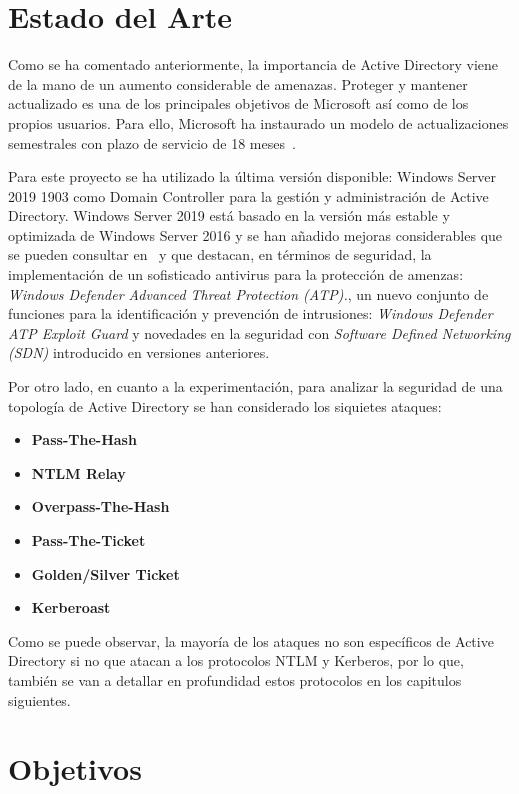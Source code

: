 \section{Estado del Arte}

Como se ha comentado anteriormente, la importancia de Active Directory viene de la mano de  un aumento considerable de amenazas. Proteger y mantener actualizado es una de los principales objetivos de Microsoft así como de los propios usuarios. Para ello, Microsoft ha instaurado un modelo de actualizaciones semestrales con plazo de servicio de 18 meses~\cite{Capitulo1:Update}.

Para este proyecto se ha utilizado la última versión disponible: Windows Server 2019 1903 como Domain Controller para la gestión y administración de Active Directory. Windows Server 2019 está basado en la versión más estable y optimizada de Windows Server 2016 y se han añadido mejoras considerables que se pueden consultar en~\cite{Capitulo1:WindowsServer2019} y que destacan, en  términos de seguridad, la implementación de un sofisticado antivirus para la protección de amenzas: {\it Windows Defender Advanced Threat Protection (ATP).}, un nuevo conjunto de funciones para la identificación y prevención de intrusiones: {\it Windows Defender ATP Exploit Guard} y novedades en la seguridad con {\it Software Defined Networking (SDN)} introducido en versiones anteriores. 

Por otro lado, en cuanto a la experimentación, para analizar la seguridad de una topología de Active Directory se han considerado los siquietes ataques:

\begin{itemize}
\item \textbf{Pass-The-Hash}
\item \textbf{NTLM Relay}
\item \textbf{Overpass-The-Hash}
\item \textbf{Pass-The-Ticket}
\item \textbf{Golden/Silver Ticket}
\item \textbf{Kerberoast}
\end{itemize}


Como se puede observar, la mayoría de los ataques no son específicos de Active Directory si no que atacan a los protocolos NTLM y Kerberos, por lo que, también se van a detallar en profundidad estos protocolos en los capitulos siguientes.


\section{Objetivos}

